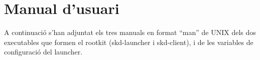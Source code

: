 \chapter{Manual d'usuari}

A continuació s'han adjuntat els tres manuals en format ``man'' de UNIX dels dos executables que formen
el rootkit (skd-launcher i skd-client), i de les variables de configuració del launcher. 





